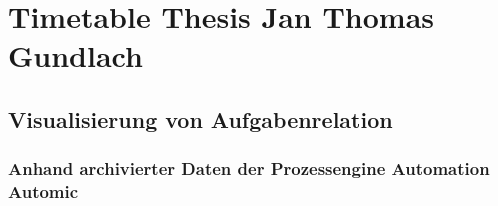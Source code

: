 \documentclass[10pt]{scrartcl} %
\title{}
\subtitle{Timetable Thesis Jan Thomas Gundlach}
\begin{document}

\section*{Timetable Thesis Jan Thomas Gundlach}
\subsection*{Visualisierung von Aufgabenrelation}
\subsubsection*{Anhand archivierter Daten der Prozessengine Automation Automic}
\end{document}
